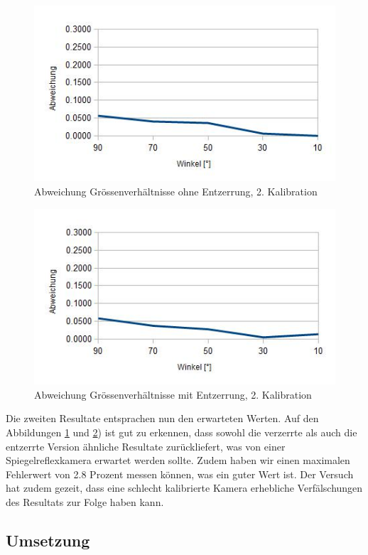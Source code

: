 \begin{figure}[!ht]
  \centering
  \includegraphics[width=0.75\linewidth]{images/ratio_v2_dist.jpg}
  \caption{Abweichung Grössenverhältnisse ohne Entzerrung, 2. Kalibration}
  \label{fig:ratio-v2-dist}
\end{figure}

\begin{figure}[!ht]
  \centering
  \includegraphics[width=0.75\linewidth]{images/ratio_v2_undist.jpg}
  \caption{Abweichung Grössenverhältnisse mit Entzerrung, 2. Kalibration}
  \label{fig:ratio-v2-undist}
\end{figure}


Die zweiten Resultate entsprachen nun den erwarteten Werten. Auf den Abbildungen \ref{fig:ratio-v2-dist} und \ref{fig:ratio-v2-undist}) ist gut zu erkennen, dass sowohl die verzerrte als auch die entzerrte Version ähnliche Resultate zurückliefert, was von einer Spiegelreflexkamera erwartet werden sollte. Zudem haben wir einen maximalen Fehlerwert von 2.8 Prozent messen können, was ein guter Wert ist. Der Versuch hat zudem gezeit, dass eine schlecht kalibrierte Kamera erhebliche Verfälschungen des Resultats zur Folge haben kann. 


\subsection{Umsetzung}

